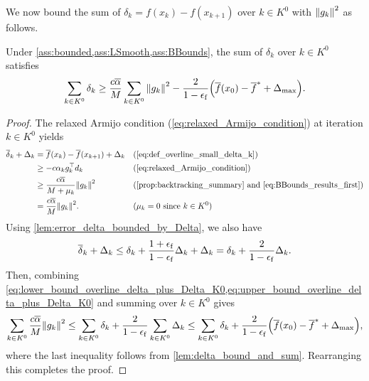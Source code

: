 \documentclass[journal]{subfiles}
\begin{document}
We now bound the sum of $\delta_k = f(x_k) - f(x_{k+1})$ over $k \in K^0$ with $\norm{g_{k}}^2$ as follows.
\begin{lemma}\label{lem:sum_small_delta_k_bound_K0}
    Under \cref{ass:bounded,ass:LSmooth,ass:BBounds}, the sum of $\delta_k$ over $k \in K^0$ satisfies
    \begin{equation*}
        \sum_{k \in K^0} \delta_{k} \geq \frac{c \overline{\alpha}}{M} \sum_{k \in K^0} \norm{g_{k}}^2 - \frac{2}{1-\epsilon_\mathrm{f}} \qty(\overline{f}(x_0) - \overline{f}^* + \Delta_{\max}).
    \end{equation*}
\end{lemma}
\begin{proof}
    The relaxed Armijo condition (\cref{eq:relaxed_Armijo_condition}) at iteration $k \in K^0$ yields
    \begin{align}
        \overline{\delta}_{k} + \Delta_{k}
         & = \overline{f}(x_{k}) - \overline{f}(x_{k+1}) + \Delta_{k} &  & (\text{\cref{eq:def_overline_small_delta_k}})                                   \notag     \\
         & \ge -c \alpha_{k} g_{k}^\top d_{k}                         &  & (\text{\cref{eq:relaxed_Armijo_condition}}) \notag                                         \\
         & \ge \frac{c \overline{\alpha}}{M+\mu_{k}} \norm{g_{k}}^2   &  & (\text{\cref{prop:backtracking_summary} and \cref{eq:BBounds_results_first}})\notag        \\
         & = \frac{c \overline{\alpha}}{M} \norm{g_{k}}^2.            &  & (\mu_{k} = 0 \text{ since } k \in K^0) \label{eq:lower_bound_overline_delta_plus_Delta_K0}
    \end{align}
    Using \cref{lem:error_delta_bounded_by_Delta}, we also have
    \begin{equation}
        \overline{\delta}_k + \Delta_{k} \le \delta_k + \frac{1+\epsilon_\mathrm{f}}{1-\epsilon_\mathrm{f}} \Delta_k + \Delta_k = \delta_k + \frac{2}{1-\epsilon_\mathrm{f}} \Delta_{k}. \label{eq:upper_bound_overline_delta_plus_Delta_K0}
    \end{equation}
    Then, combining \cref{eq:lower_bound_overline_delta_plus_Delta_K0,eq:upper_bound_overline_delta_plus_Delta_K0} and summing over $k \in K^0$ gives
    \begin{equation*}
        \sum_{k \in K^0} \frac{c \overline{\alpha}}{M} \norm{g_{k}}^2   \leq \sum_{k \in K^0} \delta_{k} + \frac{2}{1-\epsilon_\mathrm{f}} \sum_{k \in K^0} \Delta_{k}
        \leq \sum_{k \in K^0} \delta_{k} + \frac{2}{1-\epsilon_\mathrm{f}} \qty(\overline{f}(x_0) - \overline{f}^* + \Delta_{\max}),
    \end{equation*}
    where the last inequality follows from \cref{lem:delta_bound_and_sum}.
    Rearranging this completes the proof.
    \myQED
\end{proof}
\end{document}
